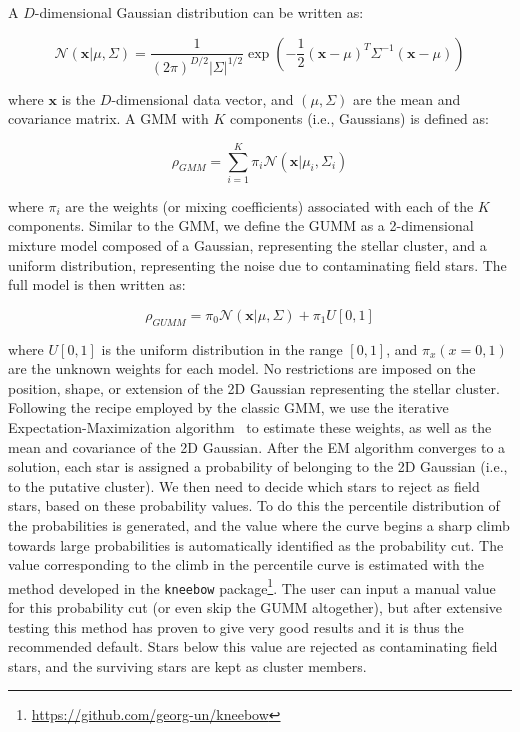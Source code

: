 \documentclass{aa}
\begin{document}
 A $D$-dimensional Gaussian distribution can be written as:

 \begin{equation}
 \mathcal{N}(\mathbf{x} | \mu, \Sigma)=
 \frac{1}{(2 \pi)^{D / 2}|\Sigma|^{1 / 2}}
 \exp \left(-\frac{1}{2}(\mathbf{x}-\mu)^{T} \Sigma^{-1}(\mathbf{x}-\mu)\right)
 \end{equation}

 \noindent where $\mathbf{x}$ is the $D$-dimensional data vector, and $
 (\mu,\Sigma)$ are the mean and covariance matrix.
 A GMM with $K$ components (i.e., Gaussians) is defined as:

 \begin{equation}
 \rho_{GMM}=\sum_{i=1}^{K} \pi_{i}
 \mathcal{N}\left(\mathbf{x} | \mu_{i}, \Sigma_{i}\right)
 \end{equation}

 \noindent where $\pi_i$ are the weights (or mixing coefficients)
 associated with each of the $K$ components. Similar to the GMM, we define the
 GUMM as a 2-dimensional mixture model composed of a Gaussian, representing
 the stellar cluster, and a uniform distribution, representing the noise due
 to contaminating field stars. The full model is then written as:

 \begin{equation}
 \rho_{GUMM}=
 \pi_{0} \mathcal{N}\left(\mathbf{x} | \mu, \Sigma\right)+ \pi_{1} U[0,1]
 \end{equation}

 \noindent where $U[0,1]$ is the uniform distribution in the range $[0,1]$,
 and $\pi_{x} (x=0,1)$ are the unknown weights for each model.
 No restrictions are imposed on the position, shape, or
 extension of the 2D Gaussian representing the stellar cluster.
 Following the recipe employed by the classic GMM, we use the
 iterative Expectation-Maximization algorithm~\citep[EM,][]{dempster_1977} to
 estimate these  weights, as well as the mean and covariance of the 2D
 Gaussian. After the EM algorithm converges to a solution, each star is
 assigned a probability of belonging to the 2D Gaussian 
 (i.e., to the putative cluster). We then need to decide which stars to reject
 as field stars, based on these probability values. To do this the percentile
 distribution of the probabilities is generated, and the value
 where the curve begins a sharp climb towards large probabilities is
 automatically identified as the probability cut. The value
 corresponding to the climb in the percentile curve is estimated with the
 method developed in the \texttt{kneebow} package\footnote{
 \url{https://github.com/georg-un/kneebow}}. The user can input a
 manual value for this probability cut (or even skip the GUMM altogether), but
 after extensive testing this method has proven to give very good results and
 it is thus the recommended default.
 Stars below this value are rejected as contaminating field stars, and the
 surviving stars are kept as cluster members.
\end{document}
